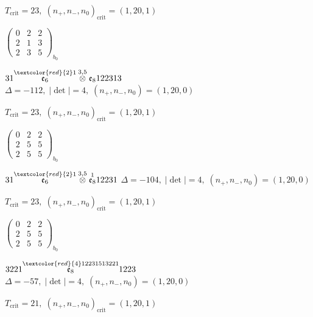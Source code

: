 \documentclass[10pt]{article}
\begin{document}
\hspace{1em}$T_{\text{crit}}=23,\; (n_+,n_-,n_0)_{\text{crit}}=(1,20,1)$

\hspace{2em}$\left(\begin{smallmatrix}0 & 2 & 2 \\ 2 & 1 & 3 \\ 2 & 3 & 5\end{smallmatrix}\right)_{\!b_0}$

\smallskip

$31\overset{\textcolor{red}{2}1}{\mathfrak{e}_6}\overset{3,5}{\otimes}\mathfrak{e}_8122313$ \quad $\Delta=-112,\; |\det|=4,\; (n_+,n_-,n_0)=(1,20,0)$

\hspace{1em}$T_{\text{crit}}=23,\; (n_+,n_-,n_0)_{\text{crit}}=(1,20,1)$

\hspace{2em}$\left(\begin{smallmatrix}0 & 2 & 2 \\ 2 & 5 & 5 \\ 2 & 5 & 5\end{smallmatrix}\right)_{\!b_0}$

\smallskip

$31\overset{\textcolor{red}{2}1}{\mathfrak{e}_6}\overset{3,5}{\otimes}\overset{1}{\mathfrak{e}_8}12231$ \quad $\Delta=-104,\; |\det|=4,\; (n_+,n_-,n_0)=(1,20,0)$

\hspace{1em}$T_{\text{crit}}=23,\; (n_+,n_-,n_0)_{\text{crit}}=(1,20,1)$

\hspace{2em}$\left(\begin{smallmatrix}0 & 2 & 2 \\ 2 & 5 & 5 \\ 2 & 5 & 5\end{smallmatrix}\right)_{\!b_0}$

\smallskip

$3221\overset{\textcolor{red}{4}12231513221}{\mathfrak{e}_8}1223$ \quad $\Delta=-57,\; |\det|=4,\; (n_+,n_-,n_0)=(1,20,0)$

\hspace{1em}$T_{\text{crit}}=21,\; (n_+,n_-,n_0)_{\text{crit}}=(1,20,1)$
\end{document}
